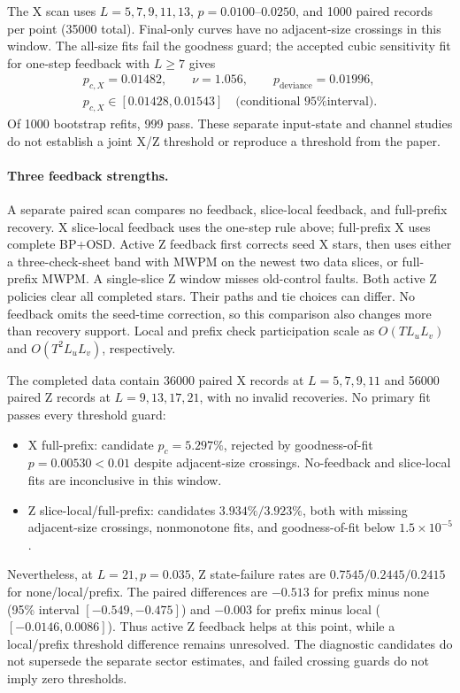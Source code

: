 \documentclass[11pt]{article}
\theoremstyle{definition}
\begin{document}
The X scan uses $L=5,7,9,11,13$, $p=0.0100$--$0.0250$, and 1000 paired
records per point (35000 total). Final-only curves have no adjacent-size
crossings in this window. The all-size fits fail the goodness guard;
the accepted cubic sensitivity fit for one-step feedback with $L\geq7$ gives
\[
 \begin{gathered}
 p_{c,X}=0.01482,\qquad \nu=1.056,\qquad
 p_{\mathrm{deviance}}=0.01996,\\
 p_{c,X}\in[0.01428,0.01543]\quad\text{(conditional 95\% interval)}.
 \end{gathered}
\]
Of 1000 bootstrap refits, 999 pass. These separate input-state and channel studies
do not establish a joint X/Z threshold or reproduce a threshold from the
paper.

\paragraph{Three feedback strengths.}
A separate paired scan compares no feedback, slice-local feedback, and
full-prefix recovery. X slice-local feedback uses the one-step rule above;
full-prefix X uses complete BP+OSD. Active Z feedback first corrects seed
X stars, then uses either a three-check-sheet band with MWPM on the newest
two data slices, or full-prefix MWPM. A single-slice Z window misses
old-control faults. Both active Z policies clear all completed stars.
Their paths and tie choices can differ. No feedback omits the seed-time
correction, so this comparison also changes more than recovery support.
Local and prefix check participation scale as $O(TL_uL_v)$ and
$O(T^2L_uL_v)$, respectively.

The completed data contain 36000 paired X records at $L=5,7,9,11$ and
56000 paired Z records at $L=9,13,17,21$, with no invalid recoveries.
No primary fit passes every threshold guard:
\begin{itemize}[nosep]
\item X full-prefix: candidate $p_c=5.297\%$, rejected by
goodness-of-fit $p=0.00530<0.01$ despite adjacent-size crossings.
No-feedback and slice-local fits are inconclusive in this window.
\item Z slice-local/full-prefix: candidates $3.934\%/3.923\%$, both
with missing adjacent-size crossings, nonmonotone fits, and
goodness-of-fit below $1.5\times10^{-5}$.
\end{itemize}
Nevertheless, at $L=21,p=0.035$, Z state-failure rates are
$0.7545/0.2445/0.2415$ for none/local/prefix. The paired differences are
$-0.513$ for prefix minus none (95\% interval $[-0.549,-0.475]$) and
$-0.003$ for prefix minus local ($[-0.0146,0.0086]$).
Thus active Z feedback helps at this
point, while a local/prefix threshold difference remains unresolved.
The diagnostic candidates do not supersede the separate sector estimates,
and failed crossing guards do not imply zero thresholds.
\end{document}
